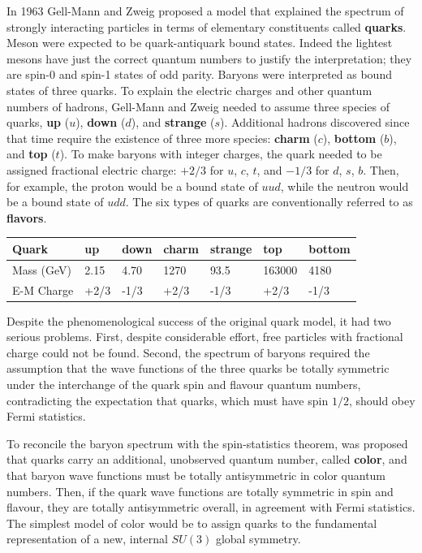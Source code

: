 \documentclass[TheoreticalPhy_ModB.tex]{subfiles}
\begin{document}
In 1963 Gell-Mann and Zweig proposed a model that explained the spectrum of strongly interacting particles in terms of elementary constituents called \textbf{quarks}. Meson were expected to be quark-antiquark bound states. Indeed the lightest mesons have just the correct quantum numbers to justify the interpretation; they are spin-0 and spin-1 states of odd parity. Baryons were interpreted as bound states of three quarks. To explain the electric charges and other quantum numbers of hadrons, Gell-Mann and Zweig needed to assume three species of quarks, \textbf{up} ($u$), \textbf{down} ($d$), and \textbf{strange} ($s$). Additional hadrons discovered since that time require the existence of three more species: \textbf{charm} ($c$), \textbf{bottom} ($b$), and \textbf{top} ($t$). To make baryons with integer charges, the quark needed to be assigned fractional electric charge: $+2/3$ for $u$, $c$, $t$, and $-1/3$ for $d$, $s$, $b$. Then, for example, the proton would be a bound state of $uud$, while the neutron would be a bound state of $udd$. The six types of quarks are conventionally referred to as \textbf{flavors}. 

\begin{table}[H]
\centering
\begin{tabular}{lllllll}
Quark & up & down & charm & strange & top & bottom \\ \hline
Mass (GeV) & 2.15 & 4.70 & 1270 & 93.5 & 163000 & 4180 \\
E-M Charge & +2/3 & -1/3 & +2/3 & -1/3 & +2/3 & -1/3
\end{tabular}
\end{table}

Despite the phenomenological success of the original quark model, it had two serious problems. First, despite considerable effort, free particles with fractional charge could not be found. Second, the spectrum of baryons required the assumption that the wave functions of the three quarks be totally symmetric under the interchange of the quark spin and flavour quantum numbers, contradicting the expectation that quarks, which must have spin $1/2$, should obey Fermi statistics. 

To reconcile the baryon spectrum with the spin-statistics theorem, was proposed that quarks carry an additional, unobserved quantum number, called \textbf{color}, and that baryon wave functions must be totally antisymmetric in color quantum numbers. Then, if the quark wave functions are totally symmetric in spin and flavour, they are totally antisymmetric overall, in agreement with Fermi statistics. The simplest model of color would be to assign quarks to the fundamental representation of a new, internal $SU(3)$ global symmetry. 
\end{document}
